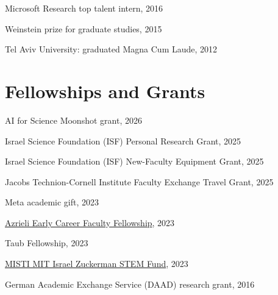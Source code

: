 \documentclass[margin,line]{res}
\begin{document}
\begin{resume}


\vspace*{-2.5mm}
Microsoft Research top talent intern, 2016 

\vspace*{-2.5mm}
Weinstein prize for graduate studies, 2015


\vspace*{-2.5mm}
Tel Aviv University: graduated Magna Cum Laude, 2012


\section{\sc Fellowships and Grants}

AI for Science Moonshot grant, 2026
\vspace*{-2.5mm} %

Israel Science Foundation (ISF) Personal Research Grant, 2025
\vspace*{-2.5mm} %

Israel Science Foundation (ISF) New-Faculty Equipment Grant, 2025
\vspace*{-2.5mm} %

Jacobs Technion-Cornell Institute Faculty Exchange Travel Grant, 2025 %
\vspace*{-2.5mm}

Meta academic gift, 2023
\vspace*{-2.5mm}

\href{https://www.google.com}{Azrieli Early Career Faculty Fellowship}, 2023 

\vspace*{-2.5mm}
Taub Fellowship, 2023

\vspace*{-2.5mm}
\href{https://misti.mit.edu/mit-israel-past-seed-fund-winners#:~:text=Or%20Litany%2C%20Technion%20%2D%20Israel%20Institute%20of%20Technology}{MISTI MIT Israel Zuckerman STEM Fund}, 2023

\vspace*{-2.5mm}
German Academic Exchange Service (DAAD) research grant, 2016


\end{resume}
\end{document}
